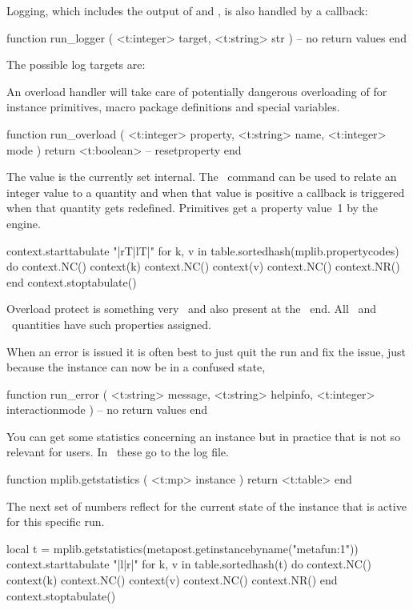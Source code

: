 Logging, which includes the output of  and , is also
handled by a callback:

\starttyping[option=LUA]
function run_logger ( <t:integer> target, <t:string> str )
    -- no return values
end
\stoptyping

The possible log targets are:


An overload handler will take care of potentially dangerous overloading of for
instance primitives, macro package definitions and special variables.

\starttyping[option=LUA]
function run_overload ( <t:integer> property, <t:string> name, <t:integer> mode )
    return <t:boolean> -- resetproperty
end
\stoptyping

The  value is the currently set 
internal. The \METAPOST\ command  can be used to
relate an integer value to a quantity and when that value is positive a callback
is triggered when that quantity gets redefined. Primitives get a property value~1
by the engine.

\startluacode
context.starttabulate { "|rT|lT|" }
for k, v in table.sortedhash(mplib.propertycodes) do
    context.NC() context(k)
    context.NC() context(v)
    context.NC() context.NR()
end
context.stoptabulate()
\stopluacode

Overload protect is something very \CONTEXT\ and also present at the \TEX\ end.
All \TEX\ and \METAPOST\ quantities have such properties assigned.

When an error is issued it is often best to just quit the run and fix the issue,
just because the instance can now be in a confused state,

\starttyping[option=LUA]
function run_error (
    <t:string>  message,
    <t:string>  helpinfo,
    <t:integer> interactionmode
)
    -- no return values
end
\stoptyping

You can get some statistics concerning an instance but in practice that is not so
relevant for users. In \CONTEXT\ these go to the log file.

\starttyping[option=LUA]
function mplib.getstatistics ( <t:mp> instance )
    return <t:table>
end
\stoptyping

The next set of numbers reflect for the current state of the 
instance that is active for this specific run.

\startcolumns[n=3]
\startluacode
local t = mplib.getstatistics(metapost.getinstancebyname("metafun:1"))
context.starttabulate { "|l|r|" }
    for k, v in table.sortedhash(t) do
        context.NC() context(k)
        context.NC() context(v)
        context.NC() context.NR()
    end
context.stoptabulate()
\stopluacode
\stopcolumns

